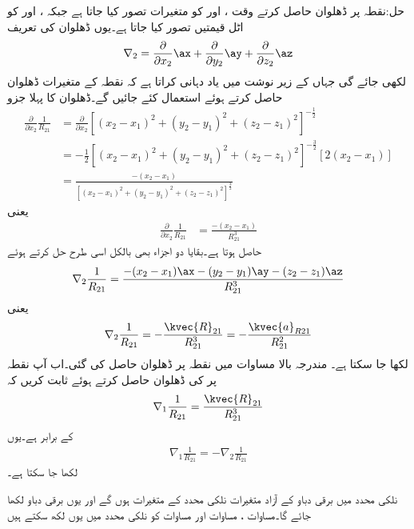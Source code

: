 حل:نقطہ  پر ڈھلوان حاصل کرتے وقت ،  اور  کو متغیرات تصور کیا جاتا ہے جبکہ ،  اور  کو اٹل قیمتیں تصور کیا جاتا ہے۔یوں ڈھلوان کی تعریف
\begin{align*}
\nabla_2 =\frac{\partial }{\partial x_2} \ax+\frac{\partial }{\partial y_2} \ay+\frac{\partial }{\partial z_2} \az 
\end{align*}
لکھی جائے گی جہاں  کے زیر نوشت میں  یاد دہانی کراتا ہے کہ نقطہ  کے متغیرات ڈھلوان حاصل کرتے ہوئے استعمال کئے جائیں گے۔ڈھلوان کا پہلا جزو
\begin{align*}
\frac{\partial }{\partial x_2} \frac{1}{R_{21}} &=\frac{\partial }{\partial x_2}[(x_2-x_1)^2+(y_2-y_1)^2+(z_2-z_1)^2]^{-\frac{1}{2}}\\
&=-\frac{1}{2} [(x_2-x_1)^2+(y_2-y_1)^2+(z_2-z_1)^2]^{-\frac{3}{2}} \left[2(x_2-x_1)\right]\\
&=\frac{-(x_2-x_1)}{ [(x_2-x_1)^2+(y_2-y_1)^2+(z_2-z_1)^2]^{\frac{3}{2}}}
\end{align*}
یعنی
\begin{align*}
\frac{\partial }{\partial x_2} \frac{1}{R_{21}} &=\frac{-(x_2-x_1)}{R_{21}^3}
\end{align*}
حاصل ہوتا ہے۔بقایا دو اجزاء بھی بالکل اسی طرح حل کرتے ہوئے
\begin{align*}
\nabla_2 \frac{1}{R_{21}} =\frac{-(x_2-x_1)\ax-(y_2-y_1)\ay-(z_2-z_1)\az}{R_{21}^3}
\end{align*}
یعنی
\begin{align}\label{مساوات_توانائی_فاصلہ_ڈھلوان}
\nabla_2 \frac{1}{R_{21}} =-\frac{\kvec{R}_{21}}{R_{21}^3}=-\frac{\kvec{a}_{R21}}{R_{21}^2}
\end{align}
لکھا جا سکتا ہے۔
مندرجہ بالا مساوات میں نقطہ  پر ڈھلوان حاصل کی گئی۔اب آپ نقطہ  پر  کی ڈھلوان حاصل کرتے ہوئے ثابت کریں کہ
\begin{align}
\nabla_1 \frac{1}{R_{21}} =\frac{\kvec{R}_{21}}{R_{21}^3}
\end{align}
کے برابر ہے۔یوں 
\begin{align}\label{مساوات_توانائی_فاصلے_کی_ڈھلوان_ب}
\nabla_1 \frac{1}{R_{21}}=-\nabla_2 \frac{1}{R_{21}}
\end{align}
لکھا جا سکتا ہے۔

نلکی محدد میں برقی دباو کے آزاد متغیرات نلکی محدد کے متغیرات ہوں گے اور یوں برقی دباو  لکھا جائے گا۔مساوات ، مساوات  اور مساوات  کو نلکی محدد میں یوں لکھ سکتے ہیں

